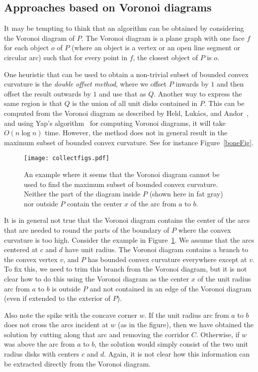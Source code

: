 \documentclass{article}
\newcommand{\PP}{P}
\newcommand{\QQ}{Q}
\begin{document}
\subsection{Approaches based on Voronoi diagrams}
It may be tempting to think that an algorithm can be obtained by considering the Voronoi diagram of $\PP$.
The Voronoi diagram is a plane graph with one face $f$ for each object $o$ of $\PP$ (where an object is a vertex or an open line segment or circular arc) such that for every point in $f$, the closest object of $\PP$ is $o$.

One heuristic that can be used to obtain a non-trivial subset of bounded convex curvature is the \emph{double offset method}, where we offset $\PP$ inwards by $1$ and then offset the result outwards by $1$ and use that as $\QQ$.
Another way to express the same region is that $\QQ$ is the union of all unit disks contained in $\PP$.
This can be computed from the Voronoi diagram as described by Held, Luk{\'a}cs, and Andor~\cite{held1994pocket}, and using Yap's algorithm~\cite{yap1987ano} for computing Voronoi diagrams, it will take $O(n\log n)$ time.
However, the method does not in general result in the maximum subset of bounded convex curvature.
See for instance Figure~\ref{boneFig}.

\begin{figure}
\centering
\texttt{[image: collectfigs.pdf]}
\caption{An example where it seems that the Voronoi diagram cannot be used to find the maximum subset of bounded convex curvature.
Neither the part of the diagram inside $\PP$ (shown here in fat gray) nor outside $\PP$ contain the center $x$ of the arc from $a$ to $b$.}
\label{fig:considerations2}
\end{figure}

It is in general not true that the Voronoi diagram contains the center of the arcs that are needed to round the parts of the boundary of $\PP$ where the convex curvature is too high.
Consider the example in Figure~\ref{fig:considerations2}.
We assume that the arcs centered at $c$ and $d$ have unit radius.
The Voronoi diagram contains a branch to the convex vertex $v$, and $\PP$ has bounded convex curvature everywhere except at $v$.
To fix this, we need to trim this branch from the Voronoi diagram, but it is not clear how to do this using the Voronoi diagram as the center $x$ of the unit radius arc from $a$ to $b$ is outside $\PP$ and not contained in an edge of the Voronoi diagram (even if extended to the exterior of $\PP$).

Also note the spike with the concave corner $w$.
If the unit radius arc from $a$ to $b$ does not cross the arcs incident at $w$ (as in the figure), then we have obtained the solution by cutting along that arc and removing the corridor $C$.
Otherwise, if $w$ was above the arc from $a$ to $b$, the solution would simply consist of the two unit radius disks with centers $c$ and $d$.
Again, it is not clear how this information can be extracted directly from the Voronoi diagram.
\end{document}
